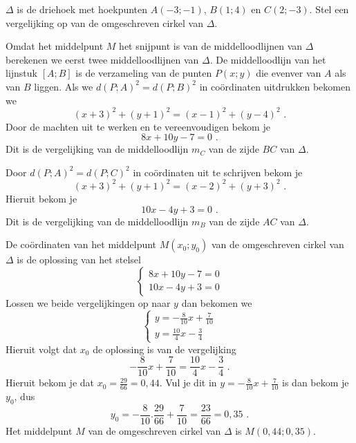 \begin{voorbeeld}
	$\Delta$ is de driehoek met hoekpunten $A(-3;-1)$, $B(1;4)$ en $C(2;-3)$.
Stel een vergelijking op van de omgeschreven cirkel van $\Delta$.

\begin{center}
	
\end{center}




Omdat het middelpunt $M$ het snijpunt is van de middelloodlijnen van $\Delta$ berekenen we eerst twee middelloodlijnen van $\Delta$.
De middelloodlijn van het lijnstuk $[A;B]$ is de verzameling van de punten $P(x;y)$ die evenver van $A$ als van $B$ liggen.
Als we $d(P;A)^2=d(P;B)^2$ in co\"ordinaten uitdrukken bekomen we
\[
(x+3)^2+(y+1)^2=(x-1)^2+(y-4)^2 \text { .}
\]
Door de machten uit te werken en te vereenvoudigen bekom je
\[
8x+10y-7=0 \text { .}
\]
Dit is de vergelijking van de middelloodlijn $m_C$ van de zijde $BC$ van $\Delta$.

Door $d(P;A)^2=d(P;C)^2$ in co\"ordinaten uit te schrijven bekom je
\[
(x+3)^2+(y+1)^2=(x-2)^2+(y+3)^2 \text { .}
\]
Hieruit bekom je
\[
10x-4y+3=0 \text { .}
\]
Dit is de vergelijking van de middelloodlijn $m_B$ van de zijde $AC$ van $\Delta$.

De co\"ordinaten van het middelpunt $M(x_0;y_0)$ van de omgeschreven cirkel van $\Delta$ is de oplossing van het stelsel
\[
\begin{cases}
8x+10y-7=0\\
10x-4y+3=0
\end{cases}
\]
Lossen we beide vergelijkingen op naar $y$ dan bekomen we
\[
\begin{cases}
y=-\frac {8}{10}x+\frac {7}{10}\\
y=\frac {10}{4}x-\frac {3}{4}
\end{cases}
\]
Hieruit volgt dat $x_0$ de oplossing is van de vergelijking
\[
-\frac {8}{10}x+\frac {7}{10}=\frac {10}{4}x-\frac {3}{4} \text { .}
\]
Hieruit bekom je dat $x_0=\frac {29}{66}=0,44$.
Vul je dit in $y=-\frac {8}{10}x+\frac {7}{10}$ is dan bekom je $y_0$, dus
\[
y_0=-\frac {8}{10}.\frac {29}{66}+\frac {7}{10}=\frac {23}{66}=0,35 \text { .}
\]
Het middelpunt $M$ van de omgeschreven cirkel van $\Delta$ is $M(0,44;0,35)$.


\end{voorbeeld}
